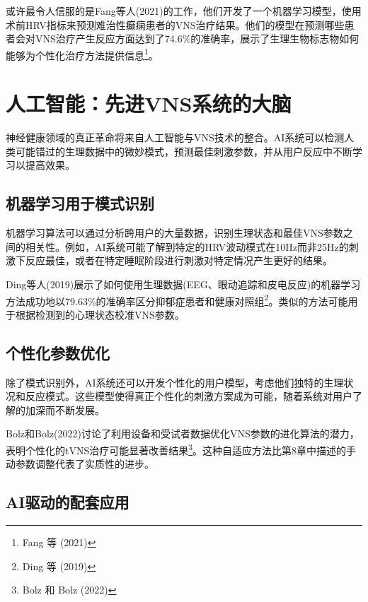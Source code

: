 \documentclass[
  Letterpaper,
]{scrbook}
\begin{document}
或许最令人信服的是Fang等人(2021)的工作，他们开发了一个机器学习模型，使用术前HRV指标来预测难治性癫痫患者的VNS治疗结果。他们的模型在预测哪些患者会对VNS治疗产生反应方面达到了74.6\%的准确率，展示了生理生物标志物如何能够为个性化治疗方法提供信息\footnote{Fang
  等 (2021)}。

\section{人工智能：先进VNS系统的大脑}\label{ux4ebaux5de5ux667aux80fdux5148ux8fdbvnsux7cfbux7edfux7684ux5927ux8111}

神经健康领域的真正革命将来自人工智能与VNS技术的整合。AI系统可以检测人类可能错过的生理数据中的微妙模式，预测最佳刺激参数，并从用户反应中不断学习以提高效果。

\subsection{机器学习用于模式识别}\label{ux673aux5668ux5b66ux4e60ux7528ux4e8eux6a21ux5f0fux8bc6ux522b}

机器学习算法可以通过分析跨用户的大量数据，识别生理状态和最佳VNS参数之间的相关性。例如，AI系统可能了解到特定的HRV波动模式在10Hz而非25Hz的刺激下反应最佳，或者在特定睡眠阶段进行刺激对特定情况产生更好的结果。

Ding等人(2019)展示了如何使用生理数据(EEG、眼动追踪和皮电反应)的机器学习方法成功地以79.63\%的准确率区分抑郁症患者和健康对照组\footnote{Ding
  等 (2019)}。类似的方法可能用于根据检测到的心理状态校准VNS参数。

\subsection{个性化参数优化}\label{ux4e2aux6027ux5316ux53c2ux6570ux4f18ux5316}

除了模式识别外，AI系统还可以开发个性化的用户模型，考虑他们独特的生理状况和反应模式。这些模型使得真正个性化的刺激方案成为可能，随着系统对用户了解的加深而不断发展。

Bolz和Bolz(2022)讨论了利用设备和受试者数据优化VNS参数的进化算法的潜力，表明个性化的tVNS治疗可能显著改善结果\footnote{Bolz
  和 Bolz (2022)}。这种自适应方法比第8章中描述的手动参数调整代表了实质性的进步。

\subsection{AI驱动的配套应用}\label{aiux9a71ux52a8ux7684ux914dux5957ux5e94ux7528}
\end{document}
